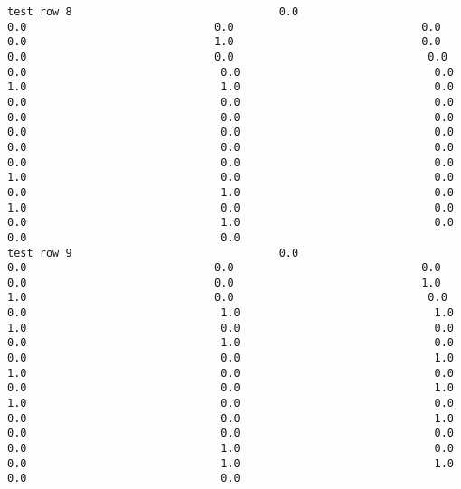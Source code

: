 \documentclass[11pt]{article}
\begin{document}
\begin{verbatim}
test row 8                                0.0                             0.0                             0.0                             0.0                             0.0                             1.0                             0.0                             0.0                             0.0                              0.0                              0.0                              0.0                              0.0                              1.0                              1.0                              0.0                              0.0                              0.0                              0.0                              0.0                              0.0                              0.0                              0.0                              0.0                              0.0                              0.0                              0.0                              0.0                              0.0                              0.0                              0.0                              1.0                              0.0                              0.0                              0.0                              1.0                              0.0                              1.0                              0.0                              0.0                              0.0                              1.0                              0.0                              0.0                              0.0
test row 9                                0.0                             0.0                             0.0                             0.0                             0.0                             0.0                             1.0                             1.0                             0.0                              0.0                              0.0                              1.0                              1.0                              1.0                              0.0                              0.0                              0.0                              1.0                              0.0                              0.0                              0.0                              1.0                              1.0                              0.0                              0.0                              0.0                              0.0                              1.0                              1.0                              0.0                              0.0                              0.0                              0.0                              1.0                              0.0                              0.0                              0.0                              0.0                              1.0                              0.0                              0.0                              1.0                              1.0                              0.0                              0.0

\end{verbatim}
\end{document}
